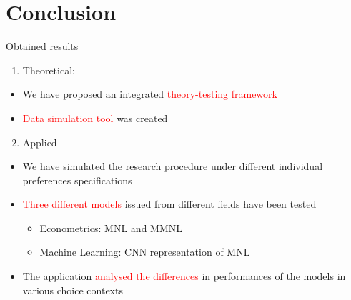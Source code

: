 \documentclass[11pt,ignorenonframetext,]{beamer}
\providecommand{\tightlist}{%
  \setlength{\itemsep}{0pt}\setlength{\parskip}{0pt}}
\begin{document}
\hypertarget{conclusion}{%
\section{Conclusion}\label{conclusion}}

\begin{frame}{Obtained results}
\protect\hypertarget{obtained-results}{}

\begin{enumerate}
\tightlist
\item
  Theoretical:
\end{enumerate}

\begin{itemize}
\tightlist
\item
  We have proposed an integrated
  \textcolor{red}{theory-testing framework}
\item
  \textcolor{red}{Data simulation tool} was created
\end{itemize}

\begin{enumerate}
\setcounter{enumi}{1}
\tightlist
\item
  Applied
\end{enumerate}

\begin{itemize}
\tightlist
\item
  We have simulated the research procedure under different individual
  preferences specifications
\item
  \textcolor{red}{Three different models} issued from different fields
  have been tested

  \begin{itemize}
  \tightlist
  \item
    Econometrics: MNL and MMNL
  \item
    Machine Learning: CNN representation of MNL
  \end{itemize}
\item
  The application \textcolor{red}{analysed the differences} in
  performances of the models in various choice contexts
\end{itemize}

\end{frame}
\end{document}
